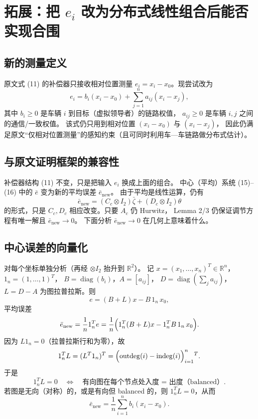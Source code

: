 
\section{拓展：把 $e_i$ 改为分布式线性组合后能否实现合围}

\subsection{新的测量定义}

原文式 (11) 的补偿器只接收相对位置测量 $e_i = x_i - x_0$。现尝试改为
\[
e_i = b_i (x_i - x_0) + \sum_{j=1}^{n} a_{ij}(x_i - x_j),
\]
其中 $b_i\ge 0$ 是车辆 $i$ 到目标（虚拟领导者）的链路权值，
$a_{ij}\ge 0$ 是车辆 $i,j$ 之间的通信/一致权值。
该式仍只用到相对位置 $(x_i-x_0)$ 与 $(x_i-x_j)$，
因此仍满足原文“仅相对位置测量”的感知约束（且可同时利用车—车链路做分布式估计）。

\subsection{与原文证明框架的兼容性}

补偿器结构 (11) 不变，只是把输入 $e_i$ 换成上面的组合。
中心（平均）系统 (15)–(16) 中的 $\bar e$ 变为新的平均误差 $\bar e_{\mathrm{new}}$。
由于平均是线性运算，仍有
\[
\bar e_{\mathrm{new}} = (C_c\otimes I_2)\bar\zeta + (D_c\otimes I_2)\theta
\]
的形式，只是 $C_c,D_c$ 相应改变。只要 $A_c$ 仍 Hurwitz，
Lemma 2/3 仍保证调节方程有唯一解且 $\bar e_{\mathrm{new}}\to 0$。
下面分析 $\bar e_{\mathrm{new}}\to 0$ 在几何上意味着什么。

\subsection{中心误差的向量化}

对每个坐标单独分析（再经 $\otimes I_2$ 抬升到 $\mathbb R^2$）。
记 $x=(x_1,\dots,x_n)^T\in\mathbb R^n$，$1_n=(1,\dots,1)^T$，
$B=\operatorname{diag}(b_i)$，$A=[a_{ij}]$，
$D=\operatorname{diag}(\sum_j a_{ij})$，$L=D-A$ 为图拉普拉斯。则
\[
e = (B+L)x - B\,1_n\,x_0,
\]
平均误差
\[
\bar e_{\mathrm{new}}
= \frac1n 1_n^T e
= \frac1n\Bigl(1_n^T(B+L)x - 1_n^T B\,1_n\,x_0\Bigr).
\]
因为 $L1_n=0$（拉普拉斯行和为零），故
\[
1_n^T L = (L^T 1_n)^T
= \Bigl(\operatorname{outdeg}(i)-\operatorname{indeg}(i)\Bigr)_{i=1}^{n}{}^{T}.
\]
于是
\[
1_n^T L = 0
\quad\Longleftrightarrow\quad
\text{有向图在每个节点处入度 = 出度（balanced）}.
\]
若图是无向（对称）的，或是有向但 balanced 的，则 $1_n^TL=0$，从而
\[
\bar e_{\mathrm{new}} = \frac{1}{n}\sum_{i=1}^n b_i(x_i-x_0).
\]


